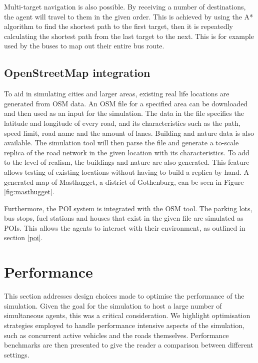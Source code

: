         Multi-target navigation is also possible. By receiving a number of destinations, the agent will travel to them in the given order. This is achieved by using the A* algorithm to find the shortest path to the first target, then it is repeatedly calculating the shortest path from the last target to the next. This is for example used by the buses to map out their entire bus route.
        
    \subsection{OpenStreetMap integration}
        To aid in simulating cities and larger areas, existing real life locations are generated from OSM data. An OSM file for a specified area can be downloaded and then used as an input for the simulation. The data in the file specifies the latitude and longitude of every road, and its characteristics such as the path, speed limit, road name and the amount of lanes. Building and nature data is also available. The simulation tool will then parse the file and generate a to-scale replica of the road network in the given location with its characteristics. To add to the level of realism, the buildings and nature are also generated. This feature allows testing of existing locations without having to build a replica by hand. A generated map of Masthugget, a district of Gothenburg, can be seen in Figure \ref{fig:masthugget}.

        Furthermore, the POI system is integrated with the OSM tool. The parking lots, bus stops, fuel stations and houses that exist in the given file are simulated as POIs. This allows the agents to interact with their environment, as outlined in section \ref{poi}.


\section{Performance}
    This section addresses design choices made to optimise the performance of the simulation. Given the goal for the simulation to host a large number of simultaneous agents, this was a critical consideration. We highlight optimisation strategies employed to handle performance intensive aspects of the simulation, such as concurrent active vehicles and the roads themselves. Performance benchmarks are then presented to give the reader a comparison between different settings.

